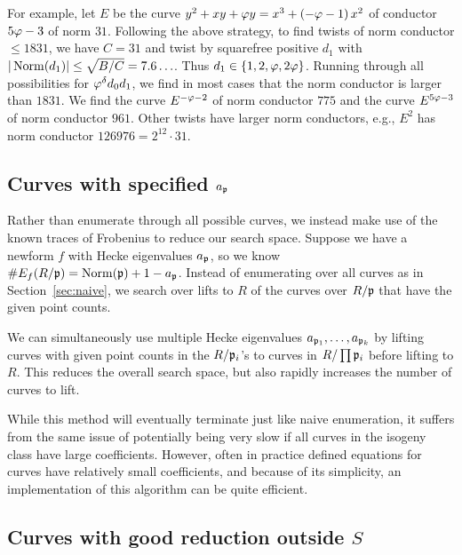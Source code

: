 \documentclass{amsart}
\begin{document}
For example, let $E$ be the curve $y^2 + xy + \varphi{}y = x^3 +
\left(-\varphi{} - 1\right)x^2 $ of conductor $5\varphi - 3$ of norm $31$.
Following the above strategy, to find twists of norm conductor $\leq
1831$, we have $C=31$ and twist by squarefree positive $d_1$ with
$|\operatorname{Norm}(d_1)| \leq \sqrt{B/C} = 7.6\ldots$.  Thus $d_1 \in \{1, 2,
\varphi, 2\varphi\}$.  Running through all possibilities for
$\varphi^{\delta} d_0 d_1$, we find in most cases that the norm
conductor is larger than $1831$.  We find the curve $E^{-\varphi-2}$ of
norm conductor $775$ and the curve $E^{5\varphi-3}$ of norm conductor
$961$.  Other twists have larger norm conductors, e.g., $E^2$ has norm
conductor $126976=2^{12}\cdot 31$.

\subsection{Curves with specified $a_{\mathfrak{p}}$}

Rather than enumerate through all possible curves, we instead make use
of the known traces of Frobenius to reduce our search space. Suppose
we have a newform $f$ with Hecke eigenvalues $a_{\mathfrak{p}}$, so we know
$\#E_f(R/\mathfrak{p})=\operatorname{Norm}(\mathfrak{p})+1-a_{\mathfrak{p}}$. Instead of enumerating over all
curves as in Section~\ref{sec:naive}, we search over lifts to $R$ of the
curves over $R/\mathfrak{p}$ that have the given point counts.

We can simultaneously use multiple Hecke eigenvalues
$a_{\mathfrak{p}_1},\ldots,a_{\mathfrak{p}_k}$ by lifting curves with given point counts
in the $R/\mathfrak{p}_i$'s to curves in $R/\prod \mathfrak{p}_i$ before lifting to
$R$. This reduces the overall search space, but also rapidly increases
the number of curves to lift.

While this method will eventually terminate just like naive
enumeration, it suffers from the same issue of potentially being very
slow if all curves in the isogeny class have large
coefficients. However, often in practice defined equations for curves
have relatively small coefficients, and because of its simplicity, an
implementation of this algorithm can be quite efficient. 


\subsection{Curves with good reduction outside $S$}
\end{document}
